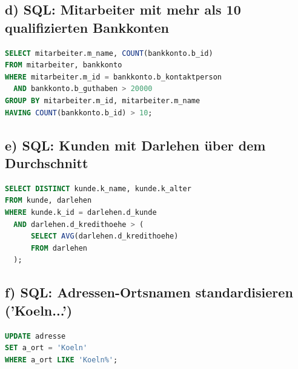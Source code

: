 \documentclass[12pt]{scrartcl}
\begin{document}
    \subsection*{d) SQL: Mitarbeiter mit mehr als 10 qualifizierten Bankkonten}
    \begin{lstlisting}[language=SQL]
SELECT mitarbeiter.m_name, COUNT(bankkonto.b_id)
FROM mitarbeiter, bankkonto
WHERE mitarbeiter.m_id = bankkonto.b_kontaktperson
  AND bankkonto.b_guthaben > 20000
GROUP BY mitarbeiter.m_id, mitarbeiter.m_name
HAVING COUNT(bankkonto.b_id) > 10;
    \end{lstlisting}

    \subsection*{e) SQL: Kunden mit Darlehen über dem Durchschnitt}
    \begin{lstlisting}[language=SQL]
SELECT DISTINCT kunde.k_name, kunde.k_alter
FROM kunde, darlehen
WHERE kunde.k_id = darlehen.d_kunde
  AND darlehen.d_kredithoehe > (
      SELECT AVG(darlehen.d_kredithoehe)
      FROM darlehen
  );
    \end{lstlisting}

    \subsection*{f) SQL: Adressen-Ortsnamen standardisieren ('Koeln...')}
    \begin{lstlisting}[language=SQL]
UPDATE adresse
SET a_ort = 'Koeln'
WHERE a_ort LIKE 'Koeln%';
    \end{lstlisting}


    \newpage

\end{document}
